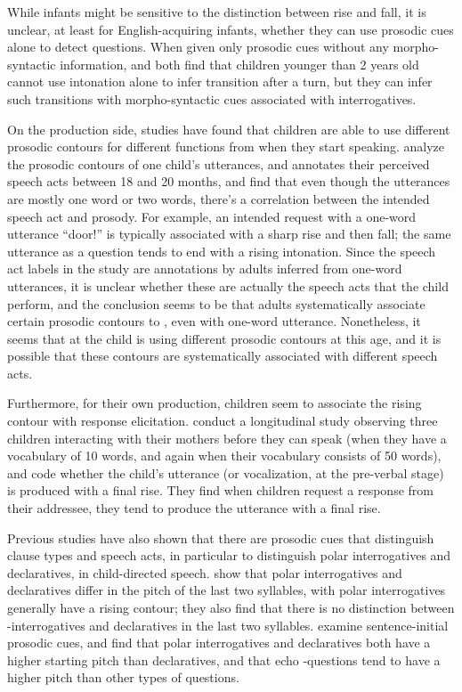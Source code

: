 While infants might be sensitive to the distinction between rise and fall, it is unclear, at least for English-acquiring infants, whether they can use prosodic cues alone to detect questions. When given only prosodic cues without any morpho-syntactic information, \textcite{keitel2013turn} and \textcite{casillas2017turn} both find that children younger than 2 years old cannot use intonation alone to infer transition after a turn, but they can infer such transitions with morpho-syntactic cues associated with interrogatives. 

On the production side, studies have found that children are able to use different prosodic contours for different functions from when they start speaking. \textcite{menyuk1969prosody} analyze the prosodic contours of one child's utterances, and annotates their perceived speech acts between 18  and 20 months, and find that even though the utterances are mostly one word or two words, there's a correlation between the intended speech act and prosody. For example, an intended request with a one-word utterance ``door!'' is typically associated with a sharp rise and then fall; the same utterance as a question tends to end with a rising intonation. Since the speech act labels in the study are annotations by adults inferred from one-word utterances, it is unclear whether these are actually the speech acts that the child perform, and the conclusion seems to be that adults systematically associate certain prosodic contours to \aqrs{}, even with one-word utterance. Nonetheless, it seems that at the child is using different prosodic contours at this age, and it is possible that these contours are systematically associated with different speech acts. 

Furthermore, for their own production, children seem to associate the rising contour with response elicitation. \textcite{flax1991prosody} conduct a longitudinal study observing three children interacting with their mothers before they can speak (when they have a vocabulary of 10 words, and again when their vocabulary consists of 50 words), and code whether the child's utterance (or vocalization, at the pre-verbal stage) is produced with a final rise. They find when children request a response from their addressee, they tend to produce the utterance with a final rise. 

Previous studies have also shown that there are prosodic cues that distinguish clause types and speech acts, in particular to distinguish polar interrogatives and declaratives, in child-directed speech. \textcite{geffenmintz2017final} show that polar interrogatives and declaratives differ in the pitch of the last two syllables, with polar interrogatives generally have a rising contour; they also find that there is no distinction between \twh-interrogatives and declaratives in the last two syllables. \textcite{chianggeffenmintz2018initial} examine sentence-initial prosodic cues, and find that polar interrogatives and declaratives both have a higher starting pitch than declaratives, and that echo \twh-questions tend to have a higher pitch than other types of questions. %

